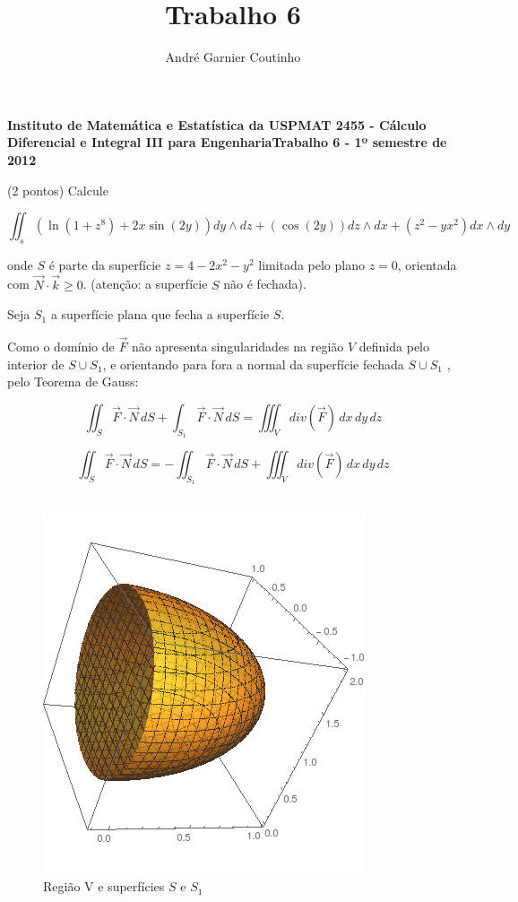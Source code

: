 \documentclass[12pt,a4paper]{article}
\title{Trabalho 6}
\author{André Garnier Coutinho}
\begin{document}
\begin{center}
\textbf{Instituto de Matemática e Estatística da USP\linebreak MAT 2455 - Cálculo Diferencial e Integral III para Engenharia\linebreak Trabalho 6 - 1º semestre de 2012}
\end{center}



 (2 pontos) Calcule

\[ \iint_{s} ( \ln (1+z^8) + 2x \sin(2y)) dy \wedge dz + (\cos(2y))dz \wedge dx + (z^2 - yx^2)dx \wedge dy \]

onde $S$ é parte da superfície $z = 4 - 2x^2 - y^2 $ limitada pelo plano $z = 0$, orientada com $ \vec{N} \cdot \vec{k} \geq 0 $. (atenção: a superfície $S$ não é fechada).


Seja $S_1$ a superfície plana que fecha a superfície $S$.


Como o domínio de $\vec{F} $ não apresenta singularidades na região $V$ definida pelo interior de $S \cup S_1 $, e orientando para fora a normal da superfície fechada $S \cup S_1$ , pelo Teorema de Gauss:

\[ \iint_{S} \vec{F}  \cdot \vec{N} \,dS + \int_{ S_1 } \vec{F}  \cdot \vec{N} \,dS = \iiint_{V} div(\vec{F})  \,dx \,dy \,dz  \]



\begin{equation}
\iint_{S} \vec{F}  \cdot \vec{N} \,dS = - \iint_{ S_1 } \vec{F}   \cdot \vec{N} \,dS  + \iiint_{V} div(\vec{F}) \,dx \,dy \,dz
\label{eq:1}
\end{equation} \\


\begin{figure}[h!]
	\centering
	\includegraphics[scale=0.5]{figura1.png}  
	\caption{Região V e superfícies $S$ e $S_1$ }
	\label{fig:figura1}
\end{figure} \\
\end{document}
